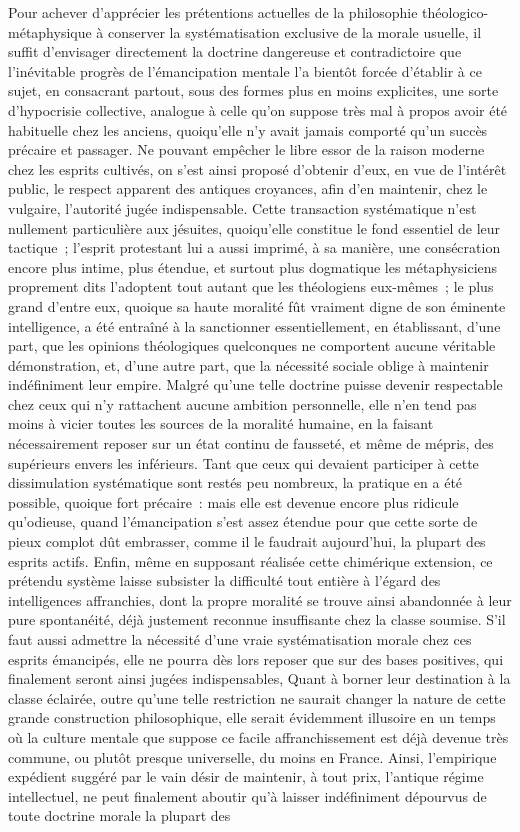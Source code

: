 \documentclass[french,twoside]{book} %
\begin{document}
Pour achever d’apprécier les prétentions actuelles de la philosophie théologico-métaphysique à conserver la systématisation exclusive de la morale usuelle, il suffit d’envisager directement la doctrine dangereuse et contradictoire que l’inévitable progrès de l’émancipation mentale l’a bientôt forcée d’établir à ce sujet, en consacrant partout, sous des formes plus en moins explicites, une sorte d’hypocrisie collective, analogue à celle qu’on suppose très mal à propos avoir été habituelle chez les anciens, quoiqu’elle n’y avait jamais comporté qu’un succès précaire et passager. Ne pouvant empêcher le libre essor de la raison moderne chez les esprits cultivés, on s’est ainsi proposé d’obtenir d’eux, en vue de l’intérêt public, le respect apparent des antiques croyances, afin d’en maintenir, chez le vulgaire, l’autorité jugée indispensable. Cette transaction systématique n’est nullement particulière aux jésuites, quoiqu’elle constitue le fond essentiel de leur tactique ; l’esprit protestant lui a aussi imprimé, à sa manière, une consécration encore plus intime, plus étendue, et surtout plus dogmatique les métaphysiciens proprement dits l’adoptent tout autant que les théologiens eux-mêmes ; le plus grand d’entre eux, quoique sa haute moralité fût vraiment digne de son éminente intelligence, a été entraîné à la sanctionner essentiellement, en établissant, d’une part, que les opinions théologiques quelconques ne comportent aucune véritable démonstration, et, d’une autre part, que la nécessité sociale oblige à maintenir indéfiniment leur empire. Malgré qu’une telle doctrine puisse devenir respectable chez ceux qui n’y rattachent aucune ambition personnelle, elle n’en tend pas moins à vicier toutes les sources de la moralité humaine, en la faisant nécessairement reposer sur un état continu de fausseté, et même de mépris, des supérieurs envers les inférieurs. Tant que ceux qui devaient participer à cette dissimulation systématique sont restés peu nombreux, la pratique en a été possible, quoique fort précaire : mais elle est devenue encore plus ridicule qu’odieuse, quand l’émancipation s’est assez étendue pour que cette sorte de pieux complot dût embrasser, comme il le faudrait aujourd’hui, la plupart des esprits actifs. Enfin, même en supposant réalisée cette chimérique extension, ce prétendu système laisse subsister la difficulté tout entière à l’égard des intelligences affranchies, dont la propre moralité se trouve ainsi abandonnée à leur pure spontanéité, déjà justement reconnue insuffisante chez la classe soumise. S’il faut aussi admettre la nécessité d’une vraie systématisation morale chez ces esprits émancipés, elle ne pourra dès lors reposer que sur des bases positives, qui finalement seront ainsi jugées indispensables, Quant à borner leur destination à la classe éclairée, outre qu’une telle restriction ne saurait changer la nature de cette grande construction philosophique, elle serait évidemment illusoire en un temps où la culture mentale que suppose ce facile affranchissement est déjà devenue très commune, ou plutôt presque universelle, du moins en France. Ainsi, l’empirique expédient suggéré par le vain désir de maintenir, à tout prix, l’antique régime intellectuel, ne peut finalement aboutir qu’à laisser indéfiniment dépourvus de toute doctrine morale la plupart des 
\end{document}
